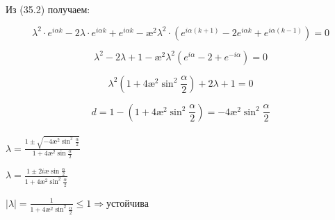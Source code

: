 \documentclass[__main__.tex]{subfiles}
\begin{document}
Из (35.2) получаем:

$$
\lambda^2 \cdot e^{i\alpha k} - 2 \lambda \cdot e^{i\alpha k} + e^{i\alpha k} - \text{\ae}^2 \lambda^2 \cdot (e^{i\alpha (k+1)} -2e^{i\alpha k} + e^{i\alpha (k-1)}) = 0
$$

$$
\lambda^2 - 2 \lambda +1 - \text{\ae}^2 \lambda^2 (e^{i\alpha} - 2 +e^{-i\alpha})= 0
$$

$$
\lambda^2 (1 + 4 \text{\ae}^2 \sin^2 \frac{\alpha}{2}) + 2 \lambda +1 = 0
$$

$$
d = 1 - (1 + 4 \text{\ae}^2 \sin^2 \frac{\alpha}{2}) = - 4 \text{\ae}^2 \sin^2 \frac{\alpha}{2} 
$$

\paragraph{} 
	$\lambda =  $$\frac{1 \pm \sqrt{- 4 \text{\ae}^2 \sin^2 \frac{\alpha}{2}}}{1 + 4 \text{\ae}^2 \sin \frac{\alpha}{2}}$$ $
	 
	 $
	 \lambda = $$\frac{1 \pm 2i \text{\ae} \sin \frac{\alpha}{2}}{1 + 4 \text{\ae}^2 \sin^2 \frac{\alpha}{2}}$$
	 $
	 
	$
	|\lambda| = $$\frac{1}{1 + 4 \text{\ae}^2 \sin^2 \frac{\alpha}{2}}$$ \leq 1 \Rightarrow \text{устойчива}
	$
\end{document}
